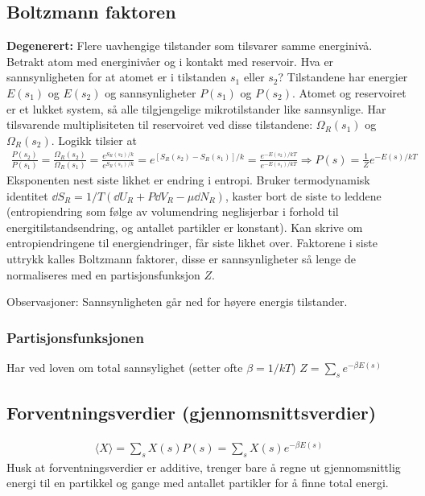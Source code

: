 \documentclass[12pt]{article}
\newcommand{\mean}[1]{\langle #1 \rangle}
\begin{document}
\subsection{Boltzmann faktoren}
\textbf{Degenerert:} Flere uavhengige tilstander som tilsvarer samme energinivå.
Betrakt atom med energinivåer og i kontakt med reservoir. Hva er sannsynligheten
for at atomet er i tilstanden $s_1$ eller $s_2$? Tilstandene har energier $E(s_1)$
og $E(s_2)$ og sannsynligheter $P(s_1)$ og $P(s_2)$. Atomet og reservoiret er
et lukket system, så alle tilgjengelige mikrotilstander like sannsynlige. Har tilsvarende
multiplisiteten til reservoiret ved disse tilstandene: $\Omega_R(s_1)$ og $\Omega_R(s_2)$.
Logikk tilsier at
\begin{align*}
  \frac{P(s_2)}{P(s_1)} = \frac{\Omega_R(s_2)}{\Omega_R(s_1)} = \frac{e^{S_R(s_2)/k}}{e^{S_R(s_1)/k}} = e^{[S_R(s_2) - S_R(s_1)]/k} = \frac{e^{-E(s_2)/kT}}{e^{-E(s_1)/kT}} \Rightarrow   P(s) = \frac{1}{Z} e^{-E(s)/kT}
\end{align*}
Eksponenten  nest siste likhet er endring i entropi. Bruker termodynamisk identitet $\dd S_R = 1/T (\dd U_R + P \dd V_R - \mu \dd N_R)$,
kaster bort de siste to leddene (entropiendring som følge av volumendring neglisjerbar i forhold til energitilstandsendring, og
antallet partikler er konstant). Kan skrive om entropiendringene til energiendringer, får siste likhet over. Faktorene i siste
uttrykk kalles Boltzmann faktorer, disse er sannsynligheter så lenge de normaliseres med en partisjonsfunksjon $Z$.

Observasjoner: Sannsynligheten går ned for høyere energis tilstander.
\subsubsection{Partisjonsfunksjonen}
Har ved loven om total sannsylighet (setter ofte $\beta = 1 / kT$)
$
  Z = \sum_s e^{-\beta E(s)}
$
\subsection{Forventningsverdier (gjennomsnittsverdier)}
\begin{align*}
  \mean{X} = \sum_s X(s) P(s) = \sum_s X(s) e^{-\beta E(s)}
\end{align*}
Husk at forventningsverdier er additive, trenger bare å regne ut gjennomsnittlig
energi til en partikkel og gange med antallet partikler for å finne total energi.
\end{document}
